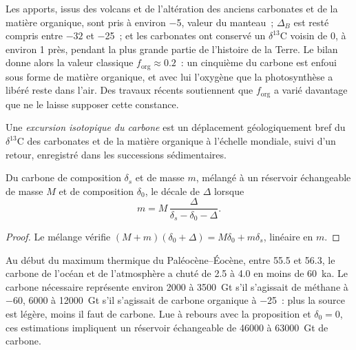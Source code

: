 Les apports, issus des volcans et de l'altération des anciens carbonates et de la
matière organique, sont pris à environ \qty{-5}{\permil}, valeur du manteau~; $\Delta_B$ est resté
compris entre $-32$ et \qty{-25}{\permil}~; et les carbonates ont conservé un
$\delta^{13}\mathrm C$ voisin de 0, à environ \qty{1}{\permil} près, pendant la plus grande partie de
l'histoire de la Terre. Le bilan donne alors la valeur classique $f_{\mathrm{org}} \approx
0.2$~: un cinquième du carbone est enfoui sous forme de matière organique, et avec lui
l'oxygène que la photosynthèse a libéré reste dans l'air. Des travaux récents soutiennent que
$f_{\mathrm{org}}$ a varié davantage que ne le laisse supposer cette constance.

\begin{definition}\label{def:b3:stable-isotopes:cie}
Une \emph{excursion isotopique du carbone} est un
déplacement géologiquement bref du $\delta^{13}\mathrm C$ des carbonates et de la matière organique
à l'échelle mondiale, suivi d'un retour, enregistré dans les successions sédimentaires.
\end{definition}

\begin{proposition}\label{prop:b3:stable-isotopes:cie-mass}
Du carbone de composition $\delta_s$ et de masse $m$, mélangé à un réservoir
échangeable de masse $M$ et de composition $\delta_0$, le décale de $\Delta$ lorsque
\[
m = M\,\frac{\Delta}{\delta_s - \delta_0 - \Delta}.
\]
\end{proposition}

\begin{proof}
Le mélange vérifie $(M + m)(\delta_0 + \Delta) = M\delta_0 + m\delta_s$, linéaire en
$m$.
\end{proof}

Au début du maximum thermique du Paléocène--Éocène, entre 55.5 et
\qty{56.3}{\Ma}, le carbone de l'océan et de l'atmosphère a chuté de 2.5 à
\qty{4.0}{\permil} en moins de \qty{60}{ka}. Le carbone nécessaire représente environ
2000 à \qty{3500}{Gt} s'il s'agissait de méthane à \qty{-60}{\permil}, 6000 à
\qty{12000}{Gt} s'il s'agissait de carbone organique à \qty{-25}{\permil}~: plus la
source est légère, moins il faut de carbone. Lue à rebours avec la proposition
et $\delta_0 = 0$, ces estimations impliquent un réservoir échangeable de \num{46000}
à \qty{63000}{Gt} de carbone.

